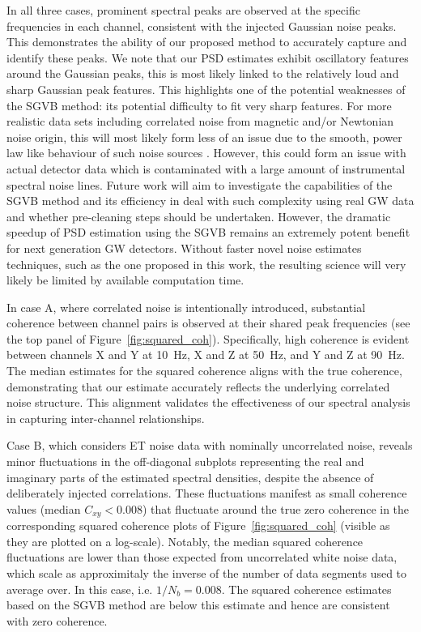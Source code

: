 \documentclass[%
 reprint,
 amsmath,amssymb,
 aps,
 nofootinbib,
]{revtex4-2}
\begin{document}
In all three cases, prominent spectral peaks are observed at the specific frequencies in each channel, consistent with the injected Gaussian noise peaks.
This demonstrates the ability of our proposed method to accurately capture and identify these peaks.
We note that our PSD estimates exhibit oscillatory features around the Gaussian peaks, this is most likely linked to the relatively loud and sharp Gaussian peak features. This highlights one of the potential weaknesses of the SGVB method: its potential difficulty to  fit very sharp features. For more realistic data sets including correlated noise from magnetic and/or Newtonian noise origin, this will most likely form less of an issue due to the smooth, power law like behaviour of such noise sources \citet{Janssens_magnetic_noise,Janssens_newtonian_seismic,PhysRevD.109.102002,Janssens2023}. However, this could form an issue with actual detector data which is contaminated with a large amount of instrumental spectral noise lines. Future work will aim to investigate the capabilities of the SGVB method and its efficiency in deal with such complexity using real GW data and whether pre-cleaning steps should be undertaken. However, the dramatic speedup of PSD estimation using the SGVB remains an extremely potent benefit for next generation GW detectors. Without faster novel noise estimates techniques, such as the one proposed in this work, the resulting science will very likely be limited by available computation time.

In case A, where correlated noise is intentionally introduced, substantial coherence between channel pairs is observed at their shared peak frequencies (see the top panel of Figure~\ref{fig:squared_coh}).
Specifically, high coherence is evident between channels X and Y at \SI{10}{Hz}, X and Z at \SI{50}{Hz}, and Y and Z at \SI{90}{Hz}.
The median estimates for the squared coherence aligns with the true coherence, demonstrating that our estimate accurately reflects the underlying correlated noise structure. This alignment validates the effectiveness of our spectral analysis in capturing inter-channel relationships.


Case B, which considers ET noise data with nominally uncorrelated noise, reveals minor fluctuations in the off-diagonal subplots representing the real and imaginary parts of the estimated spectral densities, despite the absence of deliberately injected correlations. These fluctuations manifest as small coherence values (median $C_{xy} < 0.008$) that fluctuate around the true zero coherence in the corresponding squared coherence plots of Figure~\ref{fig:squared_coh} (visible as they are plotted on a log-scale). Notably, the median squared coherence fluctuations are lower than those expected from uncorrelated white noise data, which scale as approximitaly the inverse of the number of data segments used to average over. In this case, i.e.  $1/N_b = 0.008$. The squared coherence estimates based on the SGVB method are below this estimate and hence are consistent with zero coherence.
\end{document}
